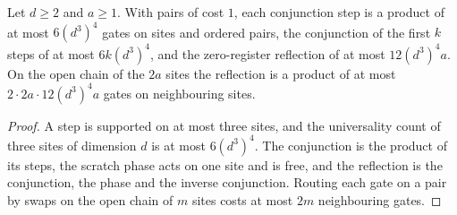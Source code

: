 \begin{theorem}
    \label{thm:zero_register_gate_count}
    \leanok
    Let $d\geq2$ and $a\geq1$. With pairs of cost $1$, each conjunction step is a product of at
    most $6(d^3)^4$ gates on sites and ordered pairs, the conjunction of the first $k$ steps of
    at most $6k(d^3)^4$, and the zero-register reflection of at most $12(d^3)^4a$. On the open
    chain of the $2a$ sites the reflection is a product of at most $2\cdot2a\cdot12(d^3)^4a$
    gates on neighbouring sites.
\end{theorem}
\begin{proof}\leanok
    A step is supported on at most three sites, and the universality count of three sites of
    dimension $d$ is at most $6(d^3)^4$. The conjunction is the product of its steps, the
    scratch phase acts on one site and is free, and the reflection is the conjunction, the
    phase and the inverse conjunction. Routing each gate on a pair by swaps on the open chain of
    $m$ sites costs at most $2m$ neighbouring gates.
\end{proof}

